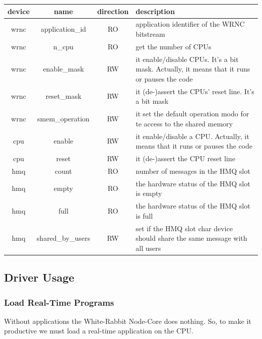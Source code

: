 \documentclass[a4paper,10pt]{article}
\begin{document}
\renewcommand{\arraystretch}{1.8}
\begin{tabular}{c c c p{6cm}}
  device & name & direction & description \\

\hline
  wrnc & application\_id & RO & application identifier of the WRNC 
bitstream \\

\hline
  wrnc & n\_cpu & RO & get the number of CPUs \\

\hline
  wrnc & enable\_mask & RW & it enable/disable CPUs. It's a bit mask. 
Actually, it means that it runs or pauses the code  \\

\hline
  wrnc & reset\_mask & RW & it (de-)assert the CPUs' reset line. It's 
a bit mask \\

\hline
  wrnc & smem\_operation & RW & it set the default operation modo for 
te access to the shared memory \\

\hline \hline

  cpu & enable & RW & it enable/disable a CPU. Actually, it means 
that it runs or pauses the code \\

\hline
  cpu & reset & RW & it (de-)assert the CPU reset line \\

\hline \hline

  hmq & count & RO & number of messages in the HMQ slot \\

\hline
  hmq & empty & RO & the hardware status of the HMQ slot is empty \\

\hline
  hmq & full & RO & the hardware status of the HMQ slot is full \\

\hline
  hmq & shared\_by\_users & RW & set if the HMQ slot char device 
should share the same message with all users \\
\end{tabular}


\subsection{Driver Usage}%
\subsubsection{Load Real-Time Programs}%
Without applications the White-Rabbit Node-Core does nothing. So, to
make it productive we must load a real-time application on the CPU.
\end{document}
